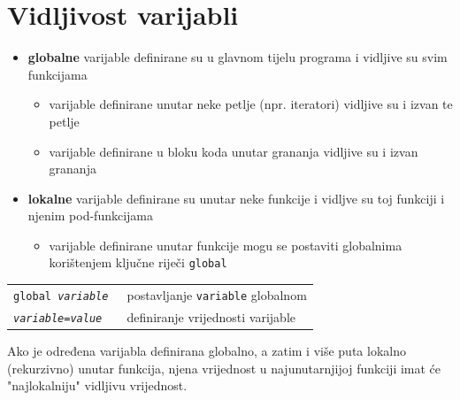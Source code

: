 \documentclass[10pt]{article}
\begin{document}
    \section*{\color{NavyBlue} Vidljivost varijabli}
    \begin{itemize}
        \item \textbf{globalne} varijable definirane su u glavnom tijelu programa i vidljive su svim funkcijama
        \begin{itemize}
            \item varijable definirane unutar neke petlje (npr. iteratori) vidljive su i izvan te petlje
            \item varijable definirane u bloku koda unutar grananja vidljive su i izvan grananja
        \end{itemize}
        \item \textbf{lokalne} varijable definirane su unutar neke funkcije i vidljve su toj funkciji i njenim pod-funkcijama
        \begin{itemize}
            \item varijable definirane unutar funkcije mogu se postaviti globalnima korištenjem ključne riječi \texttt{global}
        \end{itemize}
    \end{itemize}
    \begin{tabular}{|>{\tt}p{9.00cm}|>{}p{15.50cm}|}
        \hline
        global \textit{variable} & postavljanje \texttt{variable} globalnom
        \\
        \textit{variable}=\textit{value} & definiranje vrijednosti varijable
        \\ \hline
    \end{tabular}
    \begin{center}
        \footnotesize
        Ako je određena varijabla definirana globalno, a zatim i više puta lokalno (rekurzivno) unutar funkcija, njena vrijednost u najunutarnjijoj funkciji imat će "najlokalniju" vidljivu vrijednost. \\
    \end{center}
\end{document}
